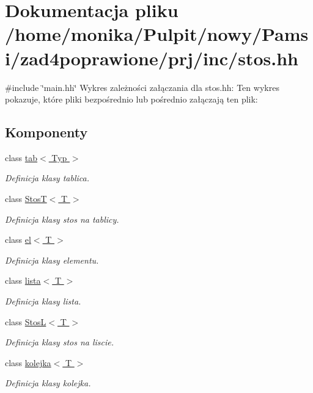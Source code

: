 \hypertarget{stos_8hh}{\section{\-Dokumentacja pliku /home/monika/\-Pulpit/nowy/\-Pamsi/zad4poprawione/prj/inc/stos.hh}
\label{stos_8hh}
}
{\ttfamily \#include \char`\"{}main.\-hh\char`\"{}}\*
\-Wykres zależności załączania dla stos.\-hh\-:
\-Ten wykres pokazuje, które pliki bezpośrednio lub pośrednio załączają ten plik\-:
\subsection*{\-Komponenty}
\begin{DoxyCompactItemize}
\item 
class \hyperlink{classtab}{tab$<$ Typ $>$}
\begin{DoxyCompactList}\small\item\em \-Definicja klasy tablica. \end{DoxyCompactList}\item 
class \hyperlink{class_stos_t}{\-Stos\-T$<$ T $>$}
\begin{DoxyCompactList}\small\item\em \-Definicja klasy stos na tablicy. \end{DoxyCompactList}\item 
class \hyperlink{classel}{el$<$ T $>$}
\begin{DoxyCompactList}\small\item\em \-Definicja klasy elementu. \end{DoxyCompactList}\item 
class \hyperlink{classlista}{lista$<$ T $>$}
\begin{DoxyCompactList}\small\item\em \-Definicja klasy lista. \end{DoxyCompactList}\item 
class \hyperlink{class_stos_l}{\-Stos\-L$<$ T $>$}
\begin{DoxyCompactList}\small\item\em \-Definicja klasy stos na liscie. \end{DoxyCompactList}\item 
class \hyperlink{classkolejka}{kolejka$<$ T $>$}
\begin{DoxyCompactList}\small\item\em \-Definicja klasy kolejka. \end{DoxyCompactList}\end{DoxyCompactItemize}
